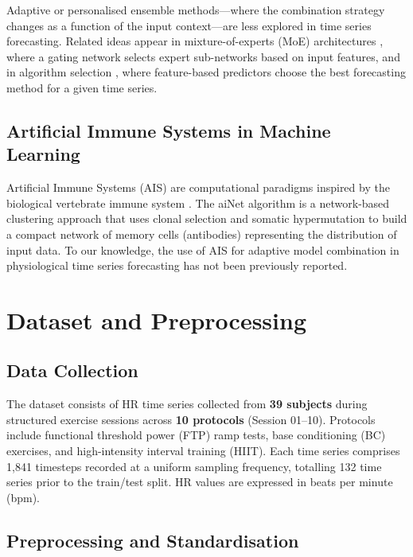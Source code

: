 \documentclass[11pt,a4paper]{article}
\begin{document}
Adaptive or personalised ensemble methods—where the combination strategy
changes as a function of the input context—are less explored in time series
forecasting.  Related ideas appear in mixture-of-experts (MoE) architectures
\cite{jacobs1991}, where a gating network selects expert sub-networks based on
input features, and in algorithm selection \cite{rice1976}, where feature-based
predictors choose the best forecasting method for a given time series.

\subsection{Artificial Immune Systems in Machine Learning}

Artificial Immune Systems (AIS) are computational paradigms inspired by the
biological vertebrate immune system \cite{dasgupta1999}.  The aiNet algorithm
\cite{decastro2000} is a network-based clustering approach that uses clonal
selection and somatic hypermutation to build a compact network of memory cells
(antibodies) representing the distribution of input data.  To our knowledge,
the use of AIS for adaptive model combination in physiological time series
forecasting has not been previously reported.

\section{Dataset and Preprocessing}
\label{sec:data}

\subsection{Data Collection}

The dataset consists of HR time series collected from \textbf{39 subjects}
during structured exercise sessions across \textbf{10 protocols}
(Session 01--10).  Protocols include functional threshold power (FTP) ramp
tests, base conditioning (BC) exercises, and high-intensity interval training
(HIIT).  Each time series comprises 1{,}841 timesteps recorded at a uniform
sampling frequency, totalling 132 time series prior to the train/test split.
HR values are expressed in beats per minute (bpm).

\subsection{Preprocessing and Standardisation}
\end{document}
